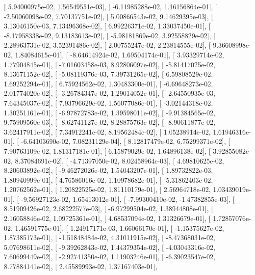 \documentclass{article}
\begin{document}
       [  5.94000975e-02,   1.56549551e-03],
       [ -6.11985288e-02,   1.16156864e-01],
       [ -2.50060098e-02,   7.70137751e-02],
       [  5.00866543e-02,   9.14629395e-03],
       [  3.13046150e-03,   7.13496368e-02],
       [  6.99226371e-02,   1.33037450e-01],
       [ -8.17958338e-02,   9.13183613e-02],
       [ -5.98181869e-02,   3.92558829e-02],
       [  2.28963731e-02,   3.52391486e-02],
       [  2.00755247e-02,   2.23814555e-02],
       [  9.36608998e-02,   1.84084615e-01],
       [ -8.64614924e-02,   1.69504174e-01],
       [  3.93329714e-02,   1.77904845e-01],
       [ -7.01603458e-03,   8.92806097e-02],
       [ -5.81417025e-02,   8.13671152e-02],
       [ -5.08119376e-03,   7.39731265e-02],
       [  6.59808529e-02,   1.69252294e-01],
       [  6.75924562e-02,   1.30483300e-01],
       [ -6.69648273e-02,   2.01774020e-02],
       [ -3.26784347e-02,   1.29014052e-01],
       [ -2.64550935e-03,   7.64345037e-02],
       [  7.93796629e-02,   1.56077086e-01],
       [ -3.02144318e-02,   1.30251161e-01],
       [ -6.97872783e-02,   1.39598011e-02],
       [ -9.91384565e-02,   9.75909560e-03],
       [ -8.62741127e-02,   8.28875763e-02],
       [ -8.90611877e-02,   3.62417911e-02],
       [  7.34912241e-02,   8.19562484e-02],
       [  1.05238914e-02,   1.61946316e-01],
       [ -6.64103690e-02,   7.08231129e-04],
       [  8.12817479e-02,   6.75299371e-02],
       [  7.90763109e-02,   1.81317181e-01],
       [  6.15879029e-02,   1.64896138e-02],
       [  3.92855082e-02,   8.37084691e-02],
       [ -4.71397050e-02,   8.02458964e-03],
       [  4.69810625e-02,   8.20603892e-02],
       [ -9.46272026e-02,   1.54043207e-01],
       [  1.89732822e-03,   1.80940999e-01],
       [  4.76586016e-02,   1.10978682e-01],
       [ -5.31862403e-02,   1.20762562e-01],
       [  1.20822525e-02,   1.81110179e-01],
       [  2.56964718e-02,   1.03439019e-01],
       [ -9.56927123e-02,   1.65413012e-01],
       [ -7.99300410e-02,  -1.47382855e-03],
       [  8.51909426e-02,   2.68222577e-03],
       [ -6.97299504e-02,   1.38944808e-01],
       [  2.16058846e-02,   1.09725361e-01],
       [  4.68537094e-02,   1.31326679e-01],
       [  1.72857076e-02,   1.46591775e-01],
       [  1.24917171e-03,   1.66066170e-01],
       [ -1.15375627e-02,   1.87385173e-01],
       [ -1.51848484e-02,   4.31011915e-02],
       [ -8.47368031e-02,   5.07698611e-02],
       [ -9.39262843e-02,   1.44379354e-02],
       [ -4.03043316e-02,   7.60699449e-02],
       [ -2.92741350e-02,   1.11903246e-01],
       [ -6.39023547e-02,   8.77884141e-02],
       [  2.45589993e-02,   1.37167403e-01],
\end{document}
